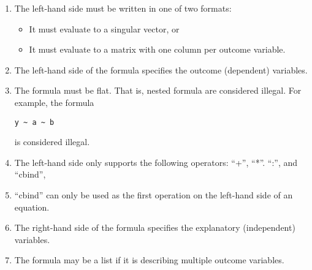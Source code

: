 \documentclass{article}
\begin{document}
\begin{enumerate}
  \item The left-hand side must be written in one of two formats:
    \begin{itemize}
      \item It must evaluate to a singular vector, or
      \item It must evaluate to a matrix with one column per outcome variable.
    \end{itemize}
  \item The left-hand side of the formula specifies the outcome (dependent) variables.
  \item The formula must be flat. That is, nested formula are considered
    illegal. For example, the formula \begin{verbatim}y ~ a ~ b\end{verbatim} is considered illegal.
  \item The left-hand side only supports the following operators: ``+'', ``*''. ``:'', and ``cbind'',
  \item ``cbind'' can only be used as the first operation on the left-hand side of an equation.
  \item The right-hand side of the formula specifies the explanatory (independent) variables.
  \item The formula may be a list if it is describing multiple outcome variables.
\end{enumerate}
\end{document}
